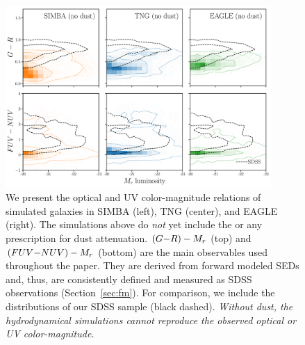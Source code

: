 \begin{figure}
\begin{center}
\includegraphics[width=0.9\textwidth]{figs/observables.pdf} 
    \caption{\label{fig:obs}
    We present the optical and UV color-magnitude relations of simulated galaxies
    in SIMBA (left), TNG (center), and EAGLE (right). The simulations above do 
    {\em not} yet include the \eda or any prescription for dust attenuation. 
    $(G{-}R)-M_r$ (top) and $(FUV{-}NUV)-M_r$ (bottom) are the main observables used 
    throughout the paper. They are derived from forward modeled SEDs and, thus, 
    are consistently defined and measured as SDSS observations
    (Section~\ref{sec:fm}). For comparison, we include the distributions of our
    SDSS sample (black dashed). {\em Without dust, the hydrodynamical simulations 
    cannot reproduce the observed optical or UV color-magnitude.}
    }
\end{center}
\end{figure}
